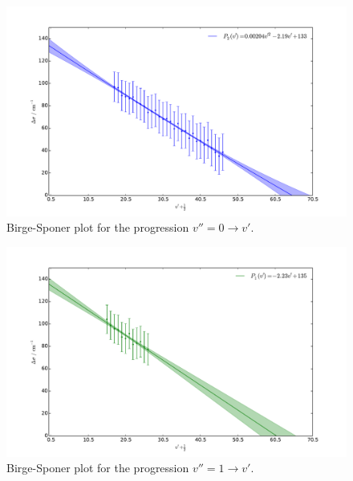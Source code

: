 \begin{figure}
    \centering
    \includegraphics[width=\pltw]{analysis/figures/b_s_0.pdf}
    \caption{Birge-Sponer plot for the progression $v'' = 0 \rightarrow v'$.  
    }
    \label{fig:b_s_0}
\end{figure}

\begin{figure}
    \centering
    \includegraphics[width=\pltw]{analysis/figures/b_s_1.pdf}
    \caption{Birge-Sponer plot for the progression $v'' = 1 \rightarrow v'$.  
    }
    \label{fig:b_s_1}
\end{figure}

